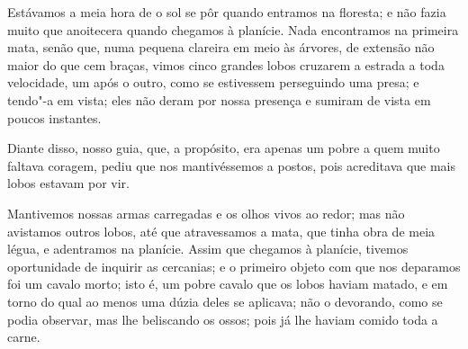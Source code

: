 Estávamos a meia hora de o sol se pôr quando entramos na floresta; e não
fazia muito que anoitecera quando chegamos à planície. Nada encontramos
na primeira mata, senão que, numa pequena clareira em meio às árvores,
de extensão não maior do que cem braças, vimos cinco grandes lobos
cruzarem a estrada a toda velocidade, um após o outro, como se
estivessem perseguindo uma presa; e tendo"-a em vista; eles não deram por
nossa presença e sumiram de vista em poucos instantes.

Diante disso, nosso guia, que, a propósito, era apenas um pobre a quem
muito faltava coragem, pediu que nos mantivéssemos a postos, pois
acreditava que mais lobos estavam por vir.

Mantivemos nossas armas carregadas e os olhos vivos ao redor; mas não
avistamos outros lobos, até que atravessamos a mata, que tinha obra de
meia légua, e adentramos na planície. Assim que chegamos à planície,
tivemos oportunidade de inquirir as cercanias; e o primeiro objeto com
que nos deparamos foi um cavalo morto; isto é, um pobre cavalo que os
lobos haviam matado, e em torno do qual ao menos uma dúzia deles se
aplicava; não o devorando, como se podia observar, mas lhe beliscando os
ossos; pois já lhe haviam comido toda a carne.

